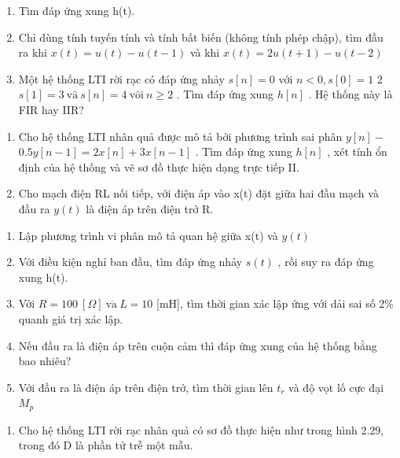 \documentclass[
  10
]{article}
\providecommand{\tightlist}{%
  \setlength{\itemsep}{0pt}\setlength{\parskip}{0pt}}
\begin{document}
\begin{enumerate}
\def\labelenumi{(\alph{enumi})}
\item
  Tìm đáp ứng xung h(t).
\item
  Chỉ dùng tính tuyến tính và tính bất biến (không tính phép chập), tìm
  đầu ra khi \(x ( t ) = u ( t ) - u ( t - 1 )\) và khi
  \(x ( t ) = 2 u ( t + 1 ) - u ( t - 2 )\)
\item
  Một hệ thống LTI rời rạc có đáp ứng nhảy \(s [ n ] = 0\) với
  \(n < 0 , s [ 0 ] = 1\) 2
  \(s [ 1 ] = 3 { \mathrm { ~ v { \hat { a } } ~ } } s [ n ] = 4 { \mathrm { ~ v { \hat { o } } i ~ } } n \geq 2\)
  . Tìm đáp ứng xung \(h [ n ]\) . Hệ thống này là FIR hay IIR?
\end{enumerate}

\begin{enumerate}
\def\labelenumi{\arabic{enumi}.}
\setcounter{enumi}{16}
\item
  Cho hệ thống LTI nhân quả được mô tả bởi phương trình sai phân
  \(y [ n ] -\) \(0 . 5 y [ n - 1 ] = 2 x [ n ] + 3 x [ n - 1 ]\) . Tìm
  đáp ứng xung \(h [ n ]\) , xét tính ổn định của hệ thống và vẽ sơ đồ
  thực hiện dạng trực tiếp II.
\item
  Cho mạch điện RL nối tiếp, với điện áp vào x(t) đặt giữa hai đầu mạch
  và đầu ra \(y ( t )\) là điện áp trên điện trở R.
\end{enumerate}

\begin{enumerate}
\def\labelenumi{(\alph{enumi})}
\item
  Lập phương trình vi phân mô tả quan hệ giữa x(t) và \(y ( t )\)
\item
  Với điều kiện nghỉ ban đầu, tìm đáp ứng nhảy \(s ( t )\) , rồi suy ra
  đáp ứng xung h(t).
\item
  Với
  \(R = 1 0 0 \ [ \Omega ] \ \mathrm { v { \dot { a } } } \ L = 1 0\)
  {[}mH{]}, tìm thời gian xác lập ứng với dải sai số 2\% quanh giá trị
  xác lập.
\item
  Nếu đầu ra là điện áp trên cuộn cảm thì đáp ứng xung của hệ thống bằng
  bao nhiêu?
\item
  Với đầu ra là điện áp trên điện trở, tìm thời gian lên \(t _ { r }\)
  và độ vọt lố cực đại \(M _ { p }\)
\end{enumerate}

\begin{enumerate}
\def\labelenumi{\arabic{enumi}.}
\setcounter{enumi}{18}
\tightlist
\item
  Cho hệ thống LTI rời rạc nhân quả có sơ đồ thực hiện như trong hình
  2.29, trong đó D là phần tử trễ một mẫu.
\end{enumerate}
\end{document}
